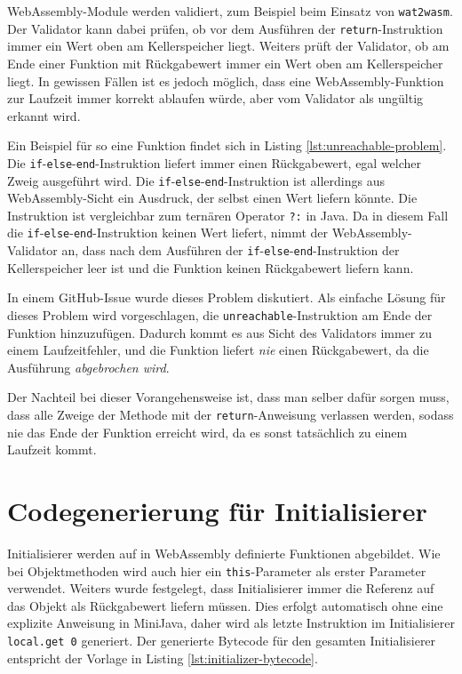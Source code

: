 WebAssembly-Module werden validiert, zum Beispiel beim Einsatz von \lstinline{wat2wasm}. Der Validator kann dabei prüfen, ob vor dem Ausführen der \lstinline{return}-Instruktion immer ein Wert oben am Kellerspeicher liegt. Weiters prüft der Validator, ob am Ende einer Funktion mit Rückgabewert immer ein Wert oben am Kellerspeicher liegt. In gewissen Fällen ist es jedoch möglich, dass eine WebAssembly-Funktion zur Laufzeit immer korrekt ablaufen würde, aber vom Validator als ungültig erkannt wird.

Ein Beispiel für so eine Funktion findet sich in Listing \ref{lst:unreachable-problem}. Die \lstinline{if}-\lstinline{else}-\lstinline{end}-Instruktion liefert immer einen Rückgabewert, egal welcher Zweig ausgeführt wird. Die \lstinline{if}-\lstinline{else}-\lstinline{end}-Instruktion ist allerdings aus WebAssembly-Sicht ein Ausdruck, der selbst einen Wert liefern könnte. Die Instruktion ist vergleichbar zum ternären Operator \lstinline{?:} in Java. Da in diesem Fall die \lstinline{if}-\lstinline{else}-\lstinline{end}-Instruktion keinen Wert liefert, nimmt der WebAssembly-Validator an, dass nach dem Ausführen der \lstinline{if}-\lstinline{else}-\lstinline{end}-Instruktion der Kellerspeicher leer ist und die Funktion keinen Rückgabewert liefern kann.



In einem GitHub-Issue \cite{WebAssemblyUnreachableWorkaround} wurde dieses Problem diskutiert. Als einfache Lösung für dieses Problem wird vorgeschlagen, die \lstinline{unreachable}-Instruktion am Ende der Funktion hinzuzufügen. Dadurch kommt es aus Sicht des Validators immer zu einem Laufzeitfehler, und die Funktion liefert \emph{nie} einen Rückgabewert, da die Ausführung \emph{abgebrochen wird}.

Der Nachteil bei dieser Vorangehensweise ist, dass man selber dafür sorgen muss, dass alle Zweige der Methode mit der \lstinline{return}-Anweisung verlassen werden, sodass nie das Ende der Funktion erreicht wird, da es sonst tatsächlich zu einem Laufzeit kommt.

\section{Codegenerierung für Initialisierer}

Initialisierer werden auf in WebAssembly definierte Funktionen abgebildet. Wie bei Objektmethoden wird auch hier ein \lstinline{this}-Parameter als erster Parameter verwendet. Weiters wurde festgelegt, dass Initialisierer immer die Referenz auf das Objekt als Rückgabewert liefern müssen. Dies erfolgt automatisch ohne eine explizite Anweisung in MiniJava, daher wird als letzte Instruktion im Initialisierer \lstinline{local.get 0} generiert. Der generierte Bytecode für den gesamten Initialisierer entspricht der Vorlage in Listing \ref{lst:initializer-bytecode}.

